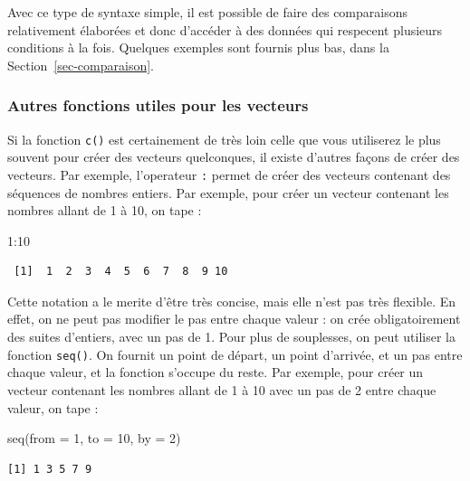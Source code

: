 \documentclass[
  a4paper,
  DIV=11,
  numbers=noendperiod,
  oneside]{scrreprt}
\newenvironment{Shaded}{}{}
\newcommand{\AttributeTok}[1]{\textcolor[rgb]{0.84,0.23,0.29}{#1}}
\newcommand{\DecValTok}[1]{\textcolor[rgb]{0.00,0.36,0.77}{#1}}
\newcommand{\FunctionTok}[1]{\textcolor[rgb]{0.44,0.26,0.76}{#1}}
\newcommand{\NormalTok}[1]{\textcolor[rgb]{0.14,0.16,0.18}{#1}}
\newcommand{\SpecialCharTok}[1]{\textcolor[rgb]{0.00,0.36,0.77}{#1}}
\begin{document}
Avec ce type de syntaxe simple, il est possible de faire des
comparaisons relativement élaborées et donc d'accéder à des données qui
respecent plusieurs conditions à la fois. Quelques exemples sont fournis
plus bas, dans la Section~\ref{sec-comparaison}.

\subsubsection{Autres fonctions utiles pour les
vecteurs}\label{autres-fonctions-utiles-pour-les-vecteurs}

Si la fonction \texttt{c()} est certainement de très loin celle que vous
utiliserez le plus souvent pour créer des vecteurs quelconques, il
existe d'autres façons de créer des vecteurs. Par exemple, l'operateur
\texttt{:} permet de créer des vecteurs contenant des séquences de
nombres entiers. Par exemple, pour créer un vecteur contenant les
nombres allant de 1 à 10, on tape :

\begin{Shaded}
\begin{Highlighting}[]
\DecValTok{1}\SpecialCharTok{:}\DecValTok{10}
\end{Highlighting}
\end{Shaded}

\begin{verbatim}
 [1]  1  2  3  4  5  6  7  8  9 10
\end{verbatim}

Cette notation a le merite d'être très concise, mais elle n'est pas très
flexible. En effet, on ne peut pas modifier le pas entre chaque valeur :
on crée obligatoirement des suites d'entiers, avec un pas de 1. Pour
plus de souplesses, on peut utiliser la fonction \texttt{seq()}. On
fournit un point de départ, un point d'arrivée, et un pas entre chaque
valeur, et la fonction s'occupe du reste. Par exemple, pour créer un
vecteur contenant les nombres allant de 1 à 10 avec un pas de 2 entre
chaque valeur, on tape :

\begin{Shaded}
\begin{Highlighting}[]
\FunctionTok{seq}\NormalTok{(}\AttributeTok{from =} \DecValTok{1}\NormalTok{, }\AttributeTok{to =} \DecValTok{10}\NormalTok{, }\AttributeTok{by =} \DecValTok{2}\NormalTok{)}
\end{Highlighting}
\end{Shaded}

\begin{verbatim}
[1] 1 3 5 7 9
\end{verbatim}
\end{document}
